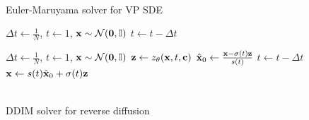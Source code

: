\begin{figure}[H]
    \centering
    \begin{minipage}{0.48\textwidth}
        \begin{algorithm}[H]
            \caption{\\Euler-Maruyama solver for VP SDE}
            \label{alg:euler_maruyama}
            \footnotesize
            \begin{algorithmic}[1]
                \vspace{2pt}
                \State $\Delta t \gets \frac{1}{N}$, $t \gets 1$, $\mathbf{x} \sim \mathcal{N}(\mathbf{0}, \mathbb{I})$
                \State{$\z \sim \normal$}
                \State $t \gets t - \Delta t$
                \EndWhile \\
                \Return{$\x$}
                \vspace{2pt}
            \end{algorithmic}
        \end{algorithm}
    \end{minipage}%
    \hspace{0.04\textwidth}%
    \begin{minipage}{0.48\textwidth}
        \begin{algorithm}[H]
            \caption{\\DDIM solver for reverse diffusion\vphantom{y}}
            \label{alg:DDIM}
            \footnotesize
            \begin{algorithmic}[1]
                \vspace{2pt}
                \State $\Delta t \gets \frac{1}{N}$, $t \gets 1$, $\mathbf{x} \sim \mathcal{N}(\mathbf{0}, \mathbb{I})$
                \State $\mathbf{z} \gets z_\theta(\mathbf{x}, t, \mathbf{c})$
                \State $\hat{\mathbf{x}}_0 \gets \frac{\mathbf{x} - \sigma(t)\mathbf{z}}{s(t)}$
                \State $t \gets t - \Delta t$
                \State $\mathbf{x} \gets s(t)\hat{\mathbf{x}}_0 + \sigma(t) \mathbf{z}$
                \EndWhile \\
                \Return{$\hat\x$}
                \vspace{2pt}
            \end{algorithmic}
        \end{algorithm}
    \end{minipage}
\end{figure}

